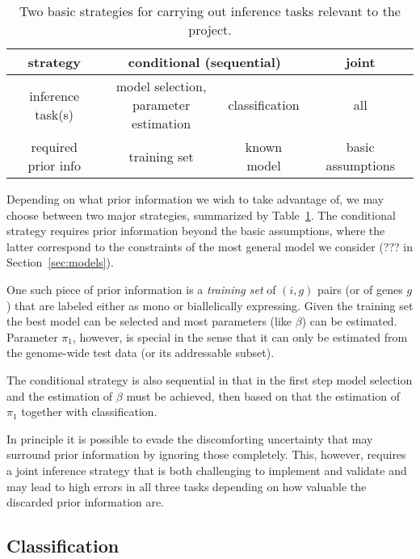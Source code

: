 \documentclass[letterpaper]{article}
\begin{document}
\begin{table}[t]
\center
\begin{tabular}{c||c|c|c|}
\hline
strategy & \multicolumn{2}{|c|}{conditional (sequential)} & joint \\
\hline
inference task(s) & \parbox{3.5 cm}{\center model selection,\\parameter estimation} & classification & all \\
\hline
\parbox{2 cm}{\center required\\prior info} & training
set & known model & basic assumptions \\
\hline
\end{tabular}
\caption{Two basic strategies for carrying out inference tasks relevant to the project.}
\label{tab:inference-strategies}
\end{table}

Depending on what prior information we wish to take advantage of, we may
choose between two major strategies, summarized by
Table~\ref{tab:inference-strategies}.  The conditional strategy requires prior
information beyond the basic assumptions, where the latter correspond to the
constraints of the most general model we consider
(??? in Section~\ref{sec:models}).

One such piece of prior information is a \emph{training set} of \((i,g)\)
pairs (or of genes \(g\)) that are labeled either as mono or biallelically
expressing.  Given the training set the best model can be selected and most
parameters (like \(\beta\)) can be estimated.  Parameter \(\pi_1\), however,
is special in the sense that it can only be estimated from the genome-wide
test data (or its addressable subset).

The conditional strategy is also sequential in that in the first step model selection and
the estimation of \(\beta\) must be achieved, then based on that the
estimation of \(\pi_1\) together with classification.

In principle it is possible to evade the discomforting uncertainty that may
surround prior information by ignoring those completely.  This, however,
requires a joint inference strategy that is both challenging to implement and
validate and may lead to high errors in all three tasks depending on how
valuable the discarded prior information are.

\subsection{Classification}
\end{document}
